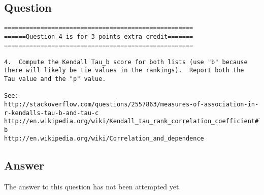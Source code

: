 \documentclass[letterpaper,11pt]{article}
\begin{document}
\subsection*{Question}

\fontsize{8pt}{8pt}\selectfont
\begin{verbatim}
====================================================
======Question 4 is for 3 points extra credit=======
====================================================

4.  Compute the Kendall Tau_b score for both lists (use "b" because
there will likely be tie values in the rankings).  Report both the
Tau value and the "p" value.

See: 
http://stackoverflow.com/questions/2557863/measures-of-association-in-r-kendalls-tau-b-and-tau-c
http://en.wikipedia.org/wiki/Kendall_tau_rank_correlation_coefficient#Tau-b
http://en.wikipedia.org/wiki/Correlation_and_dependence
\end{verbatim}

\newpage
\subsection*{Answer}

The answer to this question has not been attempted yet.

\newpage


\end{document}
